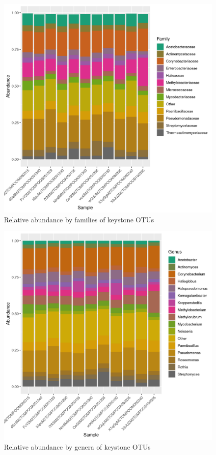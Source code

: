 \begin{figure}
\centering
\includegraphics[scale = 0.8]{tomate_aleatorio1_2.csv_relative_abundance_Family.png}
\caption{Relative abundance by families of keystone OTUs }
\label{fig:tomate_aleatorio1_2.csv_family}
\end{figure}
\begin{figure}
\centering
\includegraphics[scale = 0.8]{tomate_aleatorio1_2.csv_relative_abundance_Genus.png}
\caption{Relative abundance by genera of keystone OTUs }
\label{fig:tomate_aleatorio1_2.csv_genus}
\end{figure}
